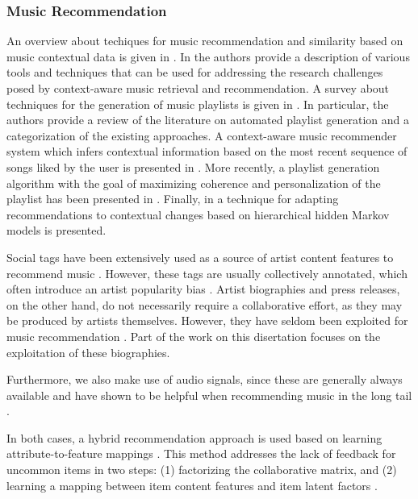 \subsubsection{Music Recommendation}
\label{sec:SOA:mir:recommendation:music}

An overview about techiques for music recommendation and similarity based on music contextual data is given in \citep{Knees2013}. 
In \citep{KaminskasR12} the authors provide a description of various tools and techniques that can be used for addressing the research
challenges posed by context-aware music retrieval and recommendation. 
A survey about techniques for the generation of music playlists is given in \citep{Bonnin2014}. In particular, the authors provide a review of the literature on automated playlist generation and a categorization of the existing approaches. 
A context-aware music recommender system which infers contextual information based on the most recent sequence of songs liked by the user is presented in \citep{HaririMB12}.
More recently, a playlist generation algorithm with the goal of maximizing coherence and personalization of the playlist has been presented in \citep{Jannach2015}. Finally, in \citep{AghdamHMB15} a technique for adapting recommendations to contextual changes based on hierarchical hidden Markov models is presented.

Social tags have been extensively used as a source of artist content features to recommend music \citep{Knees2013}. However, these tags are usually collectively annotated, which often introduce an artist popularity bias \citep{Turnbull2008}.
Artist biographies and press releases, on the other hand, do not necessarily require a collaborative effort, as they may be produced by artists themselves. 
However, they have seldom been exploited for music recommendation \citep{Oramas2015}.
Part of the work on this disertation focuses on the exploitation of these biographies.


Furthermore, we also make use of audio signals, since these are generally always available and have shown to be helpful when recommending music in the long tail \citep{Oord2013}.

In both cases, a hybrid recommendation approach is used based on learning attribute-to-feature mappings \citep{GantnerDFRS10}.
This method addresses the lack of feedback for uncommon items in two steps: (1) factorizing the collaborative matrix, and (2) learning a mapping between item content features and item latent factors \citep{Oord2013,Bansal2016}.
